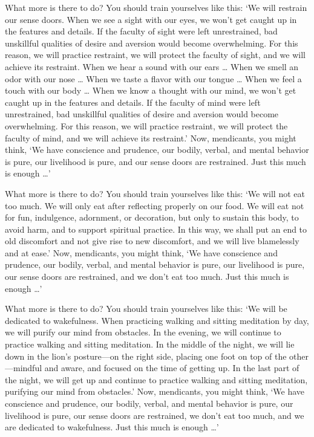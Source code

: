 \documentclass[12pt,openany]{book}%
\begin{document}
What more is there to do? You should train yourselves like this: ‘We will restrain our sense doors. When we see a sight with our eyes, we won’t get caught up in the features and details. If the faculty of sight were left unrestrained, bad unskillful qualities of desire and aversion would become overwhelming. For this reason, we will practice restraint, we will protect the faculty of sight, and we will achieve its restraint. When we hear a sound with our ears … When we smell an odor with our nose … When we taste a flavor with our tongue … When we feel a touch with our body … When we know a thought with our mind, we won’t get caught up in the features and details. If the faculty of mind were left unrestrained, bad unskillful qualities of desire and aversion would become overwhelming. For this reason, we will practice restraint, we will protect the faculty of mind, and we will achieve its restraint.’ Now, mendicants, you might think, ‘We have conscience and prudence, our bodily, verbal, and mental behavior is pure, our livelihood is pure, and our sense doors are restrained. Just this much is enough …’ 

What more is there to do? You should train yourselves like this: ‘We will not eat too much. We will only eat after reflecting properly on our food. We will eat not for fun, indulgence, adornment, or decoration, but only to sustain this body, to avoid harm, and to support spiritual practice. In this way, we shall put an end to old discomfort and not give rise to new discomfort, and we will live blamelessly and at ease.’ Now, mendicants, you might think, ‘We have conscience and prudence, our bodily, verbal, and mental behavior is pure, our livelihood is pure, our sense doors are restrained, and we don’t eat too much. Just this much is enough …’ 

What more is there to do? You should train yourselves like this: ‘We will be dedicated to wakefulness. When practicing walking and sitting meditation by day, we will purify our mind from obstacles. In the evening, we will continue to practice walking and sitting meditation. In the middle of the night, we will lie down in the lion’s posture—on the right side, placing one foot on top of the other—mindful and aware, and focused on the time of getting up. In the last part of the night, we will get up and continue to practice walking and sitting meditation, purifying our mind from obstacles.’ Now, mendicants, you might think, ‘We have conscience and prudence, our bodily, verbal, and mental behavior is pure, our livelihood is pure, our sense doors are restrained, we don’t eat too much, and we are dedicated to wakefulness. Just this much is enough …’ 
\end{document}
